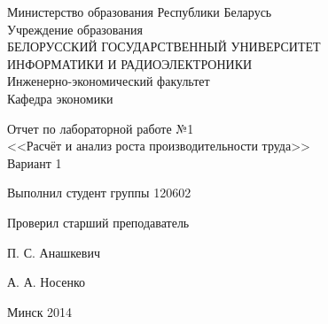 \thispagestyle{empty}
\setlength{\parindent}{0ex} %

\begin{center}
  Министерство образования Республики Беларусь \\
  \smallskip
  Учреждение образования \\
  БЕЛОРУССКИЙ ГОСУДАРСТВЕННЫЙ УНИВЕРСИТЕТ \\
  ИНФОРМАТИКИ И РАДИОЭЛЕКТРОНИКИ \\
  \smallskip
  Инженерно-экономический факультет \\
  \smallskip
  Кафедра экономики
\end{center}

\vspace{40mm}

\begin{center}
  Отчет по лабораторной работе №1 \\
  <<Расчёт и анализ роста производительности труда>> \\
  Вариант 1
\end{center}

\vspace{60mm}

\begin{minipage}{.55\linewidth}
  Выполнил студент группы 120602

  \smallskip

  Проверил старший преподаватель
\end{minipage}
\hfill
\begin{minipage}{.4\linewidth}
  \begin{flushright}
    П. С. Анашкевич

    \smallskip

    А. А. Носенко
  \end{flushright}
\end{minipage}

\vspace{55mm}
\begin{center}
  Минск 2014
\end{center}

\setlength{\parindent}{5ex} %
